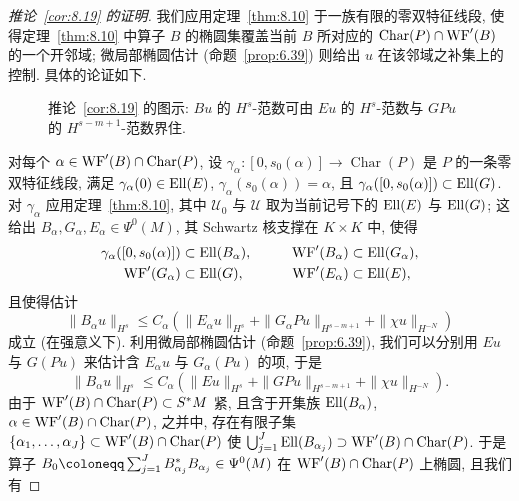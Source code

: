 \begin{proof}[推论~\ref{cor:8.19} 的证明]
我们应用定理~\ref{thm:8.10} 于一族有限的零双特征线段, 使得定理~\ref{thm:8.10} 中算子 $B$ 的椭圆集覆盖当前 $B$ 所对应的 $\operatorname{Char}(P) \cap \operatorname{WF}'(B)$ 的一个开邻域; 微局部椭圆估计 (命题~\ref{prop:6.39}) 则给出 $u$ 在该邻域之补集上的控制. 具体的论证如下.

\begin{figure}[htbp]
\centering
\drawFigEightFive
\caption{推论~\ref{cor:8.19} 的图示: $Bu$ 的 $H^s$-范数可由 $Eu$ 的 $H^s$-范数与 $GPu$ 的 $H^{s-m+1}$-范数界住.}
\label{fig:8.5}
\end{figure}

对每个 $\alpha \in \operatorname{WF}'(B) \cap \operatorname{Char}(P)$, 设 $\gamma_\alpha \colon [0, s_0(\alpha)] \to \operatorname{Char}(P)$ 是 $P$ 的一条零双特征线段, 满足 $\gamma_\alpha(0) \in \operatorname{Ell}(E)$, $\gamma_\alpha(s_0(\alpha)) = \alpha$, 且 $\gamma_\alpha([0, s_0(\alpha)]) \subset \operatorname{Ell}(G)$. 对 $\gamma_\alpha$ 应用定理~\ref{thm:8.10}, 其中 $\mathcal{U}_0$ 与 $\mathcal{U}$ 取为当前记号下的 $\operatorname{Ell}(E)$ 与 $\operatorname{Ell}(G)$; 这给出 $B_\alpha, G_\alpha, E_\alpha \in \Psi^0(M)$, 其 Schwartz 核支撑在 $K \times K$ 中, 使得
\begin{equation}\label{eq:8.77}
    \begin{aligned}
        \gamma_\alpha([0, s_0(\alpha)]) &\subset \operatorname{Ell}(B_\alpha), \qquad & \operatorname{WF}'(B_\alpha) &\subset \operatorname{Ell}(G_\alpha), \\
        \operatorname{WF}'(G_\alpha) &\subset \operatorname{Ell}(G), \qquad & \operatorname{WF}'(E_\alpha) &\subset \operatorname{Ell}(E),
    \end{aligned}
\end{equation}
且使得估计
\begin{equation}\label{eq:8.78}
    \| B_\alpha u \|_{H^s} \le C_\alpha\left( \| E_\alpha u \|_{H^s} + \| G_\alpha P u \|_{H^{s-m+1}} + \| \chi u \|_{H^{-N}} \right)
\end{equation}
成立 (在强意义下). 利用微局部椭圆估计 (命题~\ref{prop:6.39}), 我们可以分别用 $Eu$ 与 $G(Pu)$ 来估计含 $E_\alpha u$ 与 $G_\alpha(Pu)$ 的项, 于是
\begin{equation}\label{eq:8.79}
    \| B_\alpha u \|_{H^s} \le C_\alpha\left( \| E u \|_{H^s} + \| G P u \|_{H^{s-m+1}} + \| \chi u \|_{H^{-N}} \right).
\end{equation}
由于 $\operatorname{WF}'(B) \cap \operatorname{Char}(P) \subset S^*M$ 紧, 且含于开集族 $\operatorname{Ell}(B_\alpha)$, $\alpha \in \operatorname{WF}'(B) \cap \operatorname{Char}(P)$, 之并中, 存在有限子集 $\{\alpha_1, \ldots, \alpha_J\} \subset \operatorname{WF}'(B) \cap \operatorname{Char}(P)$ 使 $\bigcup_{j=1}^J \operatorname{Ell}(B_{\alpha_j}) \supset \operatorname{WF}'(B) \cap \operatorname{Char}(P)$. 于是算子 $B_0 \defeq \sum_{j=1}^J B_{\alpha_j}^* B_{\alpha_j} \in \Psi^0(M)$ 在 $\operatorname{WF}'(B) \cap \operatorname{Char}(P)$ 上椭圆, 且我们有

\end{proof}

